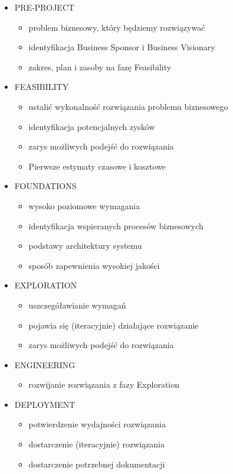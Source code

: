 \documentclass[a4paper]{article}
\begin{document}
\begin{itemize}
    \item PRE-PROJECT
    \begin{itemize}
        \item problem biznesowy, który będziemy rozwiązywać
        \item identyfikacja Business Sponsor i Business Visionary
        \item zakres, plan i zasoby na fazę Feasibility
    \end{itemize}
    \item FEASIBILITY
    \begin{itemize}
        \item ustalić wykonalność rozwiązania problemu biznesowego
        \item identyfikacja potencjalnych zysków
        \item zarys możliwych podejść do rozwiązania
        \item Pierwsze estymaty czasowe i kosztowe
    \end{itemize}
    \item FOUNDATIONS
    \begin{itemize}
        \item wysoko poziomowe wymagania
        \item identyfikacja wspieranych procesów biznesowych
        \item podstawy architektury systemu
        \item sposób zapewnienia wysokiej jakości
    \end{itemize}
    \item EXPLORATION
    \begin{itemize}
        \item uszczegóławianie wymagań
        \item pojawia się (iteracyjnie) działające rozwiązanie
        \item zarys możliwych podejść do rozwiązania
    \end{itemize}
    \item ENGINEERING
    \begin{itemize}
        \item rozwijanie rozwiązania z fazy Exploration
    \end{itemize}
    \item DEPLOYMENT
    \begin{itemize}
        \item potwierdzenie wydajności rozwiązania
        \item dostarczenie (iteracyjnie) rozwiązania
        \item dostarczenie potrzebnej dokumentacji
    \end{itemize}
\end{itemize}
\end{document}
